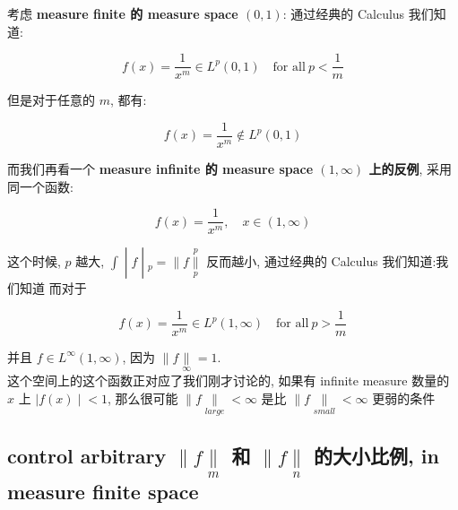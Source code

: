 \documentclass{qlnotes-export}
\begin{document}
\begin{example}

考虑 \textbf{measure finite 的 measure space \((0,1)\)}: 通过经典的 Calculus 我们知道:

\[f(x) = \frac{1}{x^{m}} \in L^{p}(0,1)\quad\text{for all}\ p < \frac{1}{m}\]

但是对于任意的 \(m\), 都有:

\[f(x) = \frac{1}{x^{m}} \notin L^{p}(0,1)\]

而我们再看一个 \textbf{measure infinite 的 measure space \((1,\infty)\) 上的反例}, 采用同一个函数:

\[f(x) = \frac{1}{x^{m}},\quad x \in (1,\infty)\]

这个时候, \(p\) 越大, \(\left. \int \middle| f \middle| {}_{p} = \parallel f\underset{p}{\overset{p}{\parallel}} \right.\) 反而越小, 通过经典的 Calculus 我们知道:我们知道 而对于

\[f(x) = \frac{1}{x^{m}} \in L^{p}(1,\infty)\quad\text{for all}\ p > \frac{1}{m}\]

并且 \(f \in L^{\infty}(1,\infty)\), 因为 \(\parallel f\underset{\infty}{\parallel} = 1\).\\
这个空间上的这个函数正对应了我们刚才讨论的, 如果有 infinite measure 数量的 \(x\) 上 \(\left. |f(x) \middle| < 1 \right.\), 那么很可能 \(\parallel f\underset{large}{\parallel} < \infty\) 是比 \(\parallel f\underset{small}{\parallel} < \infty\) 更弱的条件

\end{example}

\subsection{\texorpdfstring{control arbitrary \(\parallel f\underset{m}{\parallel}\) 和 \(\parallel f\underset{n}{\parallel}\) 的大小比例, in measure finite space}{control arbitrary \textbackslash parallel f\textbackslash underset\{m\}\{\textbackslash parallel\} 和 \textbackslash parallel f\textbackslash underset\{n\}\{\textbackslash parallel\} 的大小比例, in measure finite space}}\label{control-arbitrary-parallel-fundersetmparallel-ux548c-parallel-fundersetnparallel-ux7684ux5927ux5c0fux6bd4ux4f8b-in-measure-finite-space}
\end{document}
